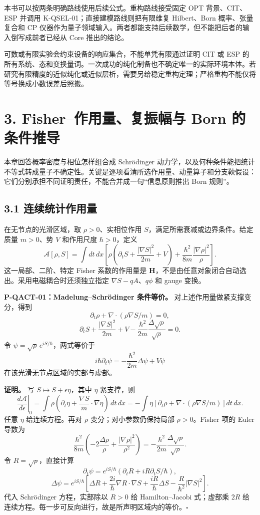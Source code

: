 \documentclass[
  11pt,
  oneside]{book}
\begin{document}
本书可以按两条明确路线使用后续公式。重构路线接受固定 OPT 背景、CIT、ESP
并调用 K-QSEL-01；直接建模路线则把有限维复 Hilbert、Born
概率、张量复合和 CP
仪器作为量子领域输入。两者都能支持后续数学，但不能把后者的输入倒写成前者已经从
Core 推出的结论。

可数或有限实验会约束设备的响应集合，不能单凭有限通过证明 CIT 或 ESP
的所有系统、态和变换量词。一次成功的纯化制备也不确定唯一的实际环境本体。若研究有限精度的近似纯化或近似层析，需要另给稳定重构定理；严格重构不能仅将等号换成小数误差后照搬。

\chapter{3. Fisher--作用量、复振幅与 Born 的条件推导}\label{ch-3}\hypertarget{ch-3}{}

本章回答概率密度与相位怎样组合成 Schrödinger
动力学，以及何种条件能把统计不等式转成量子不确定性。关键是逐项看清所选作用量、动量算子和分支鞅假设：它们分别承担不同证明责任，不能合并成一句``信息原则推出
Born 规则''。

\section{3.1 连续统计作用量}

在无节点的光滑区域，取 \(\rho>0\)、实相位作用
\(S\)，满足所需衰减或边界条件。给定质量 \(m>0\)、势 \(V\) 和作用尺度
\(\hbar>0\)，定义 \[
\mathcal A[\rho,S]=\int dt\,dx\left[
\rho\left(\partial_tS+\frac{|\nabla S|^2}{2m}+V\right)
+\frac{\hbar^2}{8m}\frac{|\nabla\rho|^2}{\rho}\right].
\] 这一局部、二阶、特定 Fisher 系数的作用量是
\textbf{H}，不是由任意对象闭合自动选出。采用电磁耦合时还须独立指定
\(\nabla S-qA\)、\(q\phi\) 和 gauge 变换。

\protect\hypertarget{p-qact-01}{}{}

\textbf{P-QACT-01：Madelung--Schrödinger 条件等价。}
对上述作用量做紧支撑变分，得到 \[
\partial_t\rho+\nabla\cdot(\rho\nabla S/m)=0,
\] \[
\partial_tS+\frac{|\nabla S|^2}{2m}+V
-\frac{\hbar^2}{2m}\frac{\Delta\sqrt\rho}{\sqrt\rho}=0.
\] 令 \(\psi=\sqrt\rho\,e^{iS/\hbar}\)，两式等价于 \[
i\hbar\partial_t\psi=
-\frac{\hbar^2}{2m}\Delta\psi+V\psi
\] 在该光滑无节点区域的实部与虚部。

\textbf{证明。} 写 \(S\mapsto S+\epsilon\eta\)，其中 \(\eta\) 紧支撑，则
\[
\left.\frac{d\mathcal A}{d\epsilon}\right|_0
=\int\rho\left(\partial_t\eta+\frac{\nabla S}{m}\cdot\nabla\eta\right)\,dt\,dx
=-\int\eta\left[\partial_t\rho+\nabla\cdot(\rho\nabla S/m)\right]dt\,dx.
\] 任意 \(\eta\) 给连续方程。再对 \(\rho\) 变分；对小参数仍保持局部
\(\rho>0\)。Fisher 项的 Euler 导数为 \[
\frac{\hbar^2}{8m}
\left(-2\frac{\Delta\rho}{\rho}
+\frac{|\nabla\rho|^2}{\rho^2}\right)
=-\frac{\hbar^2}{2m}\frac{\Delta\sqrt\rho}{\sqrt\rho}.
\] 令 \(R=\sqrt\rho\)，直接计算 \[
\partial_t\psi=e^{iS/\hbar}(\partial_tR+iR\partial_tS/\hbar),
\] \[
\Delta\psi=e^{iS/\hbar}\left[\Delta R+
\frac{2i}{\hbar}\nabla R\cdot\nabla S+
\frac{iR}{\hbar}\Delta S-\frac{R}{\hbar^2}|\nabla S|^2\right].
\] 代入 Schrödinger 方程，实部除以 \(R>0\) 给 Hamilton--Jacobi
式；虚部乘 \(2R\)
给连续方程。每一步可反向进行，故是所声明区域内的等价。\(\square\)
\end{document}

